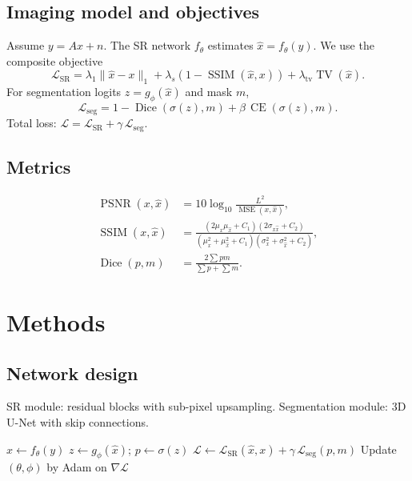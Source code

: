 \documentclass[12pt,a4paper,twoside,openright]{book}
\begin{document}
\section{Imaging model and objectives}
Assume \(y = A x + n\). The SR network \(f_\theta\) estimates
\(\hat x = f_\theta(y)\).
We use the composite objective
\begin{equation}
  \mathcal{L}_{\mathrm{SR}}
  = \lambda_1 \lVert \hat x - x \rVert_1
  + \lambda_s \left(1-\operatorname{SSIM}(\hat x, x)\right)
  + \lambda_{\mathrm{tv}} \operatorname{TV}(\hat x).
  \label{eq:sr_loss}
\end{equation}
For segmentation logits \(z = g_\phi(\hat x)\) and mask \(m\),
\begin{equation}
  \mathcal{L}_{\mathrm{seg}}
  = 1 - \operatorname{Dice}\!\left(\sigma(z), m\right)
    + \beta\, \operatorname{CE}\!\left(\sigma(z), m\right).
  \label{eq:seg_loss}
\end{equation}
Total loss:
\(\mathcal{L} = \mathcal{L}_{\mathrm{SR}} + \gamma\,\mathcal{L}_{\mathrm{seg}}\).

\section{Metrics}
\begin{align}
\operatorname{PSNR}(x,\hat x) &= 10\log_{10}\!\frac{L^2}{\operatorname{MSE}(x,\hat x)},\\
\operatorname{SSIM}(x,\hat x) &= \frac{(2\mu_x\mu_{\hat x}+C_1)(2\sigma_{x\hat x}+C_2)}
{(\mu_x^2+\mu_{\hat x}^2+C_1)(\sigma_x^2+\sigma_{\hat x}^2+C_2)},\\
\operatorname{Dice}(p,m) &= \frac{2\sum p m}{\sum p + \sum m}.
\end{align}

\chapter{Methods}
\section{Network design}
SR module: residual blocks with sub-pixel upsampling.
Segmentation module: 3D U-Net with skip connections. \cite{lecun2015deep}

\begin{algorithm}
\caption{Joint SR+Seg training}
\label{alg:train}
\begin{algorithmic}[1]
      \State $\hat x \gets f_\theta(y)$
      \State $z \gets g_\phi(\hat x)$; $p\gets\sigma(z)$
      \State $\mathcal{L}\gets \mathcal{L}_{\mathrm{SR}}(\hat x,x)+\gamma\,\mathcal{L}_{\mathrm{seg}}(p,m)$
      \State Update $(\theta,\phi)$ by Adam on $\nabla \mathcal{L}$
    \EndFor
  \EndFor
\EndProcedure
\end{algorithmic}
\end{algorithm}
\end{document}
